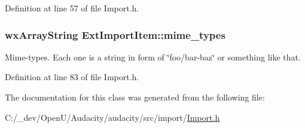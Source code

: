 Definition at line 57 of file Import.\+h.

\subsubsection[{\texorpdfstring{mime\+\_\+types}{mime_types}}]{\setlength{\rightskip}{0pt plus 5cm}wx\+Array\+String Ext\+Import\+Item\+::mime\+\_\+types}\hypertarget{class_ext_import_item_a4df49043980dda3886b6e2e7ff3ddf32}{}\label{class_ext_import_item_a4df49043980dda3886b6e2e7ff3ddf32}
Mime-\/types. Each one is a string in form of \char`\"{}foo/bar-\/baz\char`\"{} or something like that. 

Definition at line 83 of file Import.\+h.



The documentation for this class was generated from the following file\+:\begin{DoxyCompactItemize}
\item 
C\+:/\+\_\+dev/\+Open\+U/\+Audacity/audacity/src/import/\hyperlink{_import_8h}{Import.\+h}\end{DoxyCompactItemize}
